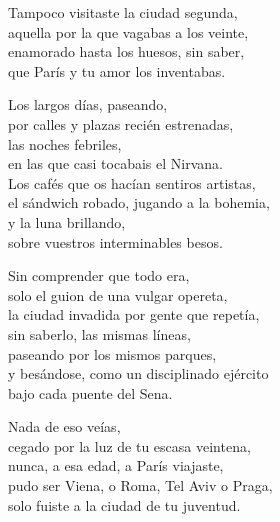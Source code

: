\documentclass[12pt,twoside]{article}
\begin{document}
\begin{poem}
\begin{stanza}
Tampoco visitaste la ciudad segunda,\\
aquella por la que vagabas a los veinte,\\
enamorado hasta los huesos, sin saber,\\
que París y tu amor los inventabas.
\end{stanza}
\begin{stanza}
Los largos días, paseando,\\
por calles y plazas recién estrenadas,\\
las noches febriles,\\
en las que casi tocabais el Nirvana.\\
Los cafés que os hacían sentiros artistas,\\
el sándwich robado, jugando a la bohemia,\\
y la luna brillando,\\
sobre vuestros interminables besos.
\end{stanza}
\begin{stanza}
Sin comprender que todo era,\\
solo el guion de una vulgar opereta,\\
la ciudad invadida por gente que repetía,\\
sin saberlo, las mismas líneas,\\
paseando por los mismos parques,\\
y besándose, como un disciplinado ejército\\
bajo cada puente del Sena.
\end{stanza}
\begin{stanza}
Nada de eso veías,\\
cegado por la luz de tu escasa veintena,\\
nunca, a esa edad, a París viajaste,\\
pudo ser Viena, o Roma, Tel Aviv o Praga,\\
solo fuiste a la ciudad de tu juventud.
\end{stanza}
\end{poem}
\end{document}
